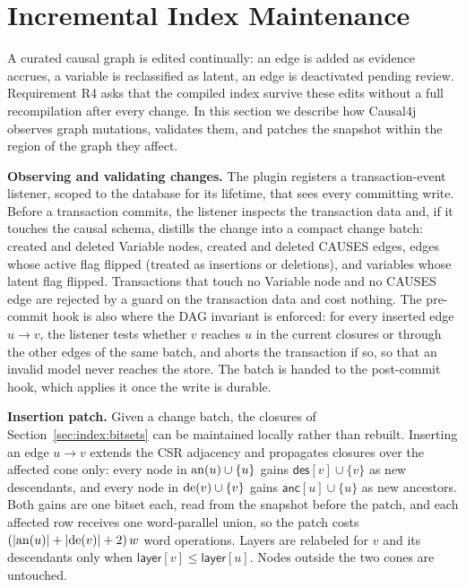 \section{Incremental Index Maintenance}\label{sec:incr}

A curated causal graph is edited continually: an edge is added as evidence
accrues, a variable is reclassified as latent, an edge is deactivated pending
review. Requirement R4 asks that the compiled index survive these edits
without a full recompilation after every change. In this section we describe
how Causal4j observes graph mutations, validates them, and patches the
snapshot within the region of the graph they affect.

\noindent\textbf{Observing and validating changes.} The plugin registers a
transaction-event listener, scoped to the database for its lifetime, that
sees every committing write. Before a transaction commits, the listener
inspects the transaction data and, if it touches the causal schema, distills
the change into a compact change batch: created and deleted \textsf{Variable}
nodes, created and deleted \textsf{CAUSES} edges, edges whose \textsf{active}
flag flipped (treated as insertions or deletions), and variables whose
\textsf{latent} flag flipped. Transactions that touch no \textsf{Variable}
node and no \textsf{CAUSES} edge are rejected by a guard on the transaction
data and cost nothing. The pre-commit hook is also where the DAG invariant is
enforced: for every inserted edge $u \rightarrow v$, the listener tests
whether $v$ reaches $u$ in the current closures or through the other edges of
the same batch, and aborts the transaction if so, so that an invalid model
never reaches the store. The batch is handed to the post-commit hook, which
applies it once the write is durable.

\noindent\textbf{Insertion patch.} Given a change batch, the closures of
Section~\ref{sec:index:bitsets} can be maintained locally rather than
rebuilt. Inserting an edge $u \rightarrow v$ extends the CSR adjacency and
propagates closures over the affected cone only: every node in
$\mathrm{an}(u) \cup \{u\}$ gains $\textsf{des}[v] \cup \{v\}$ as new descendants, and
every node in $\mathrm{de}(v) \cup \{v\}$ gains $\textsf{anc}[u] \cup \{u\}$ as new
ancestors. Both gains are one bitset each, read from the snapshot before the
patch, and each affected row receives one word-parallel union, so the patch
costs $(|\mathrm{an}(u)| + |\mathrm{de}(v)| + 2)\,w$ word operations. Layers are relabeled
for $v$ and its descendants only when $\textsf{layer}[v] \le
\textsf{layer}[u]$. Nodes outside the two cones are untouched.

